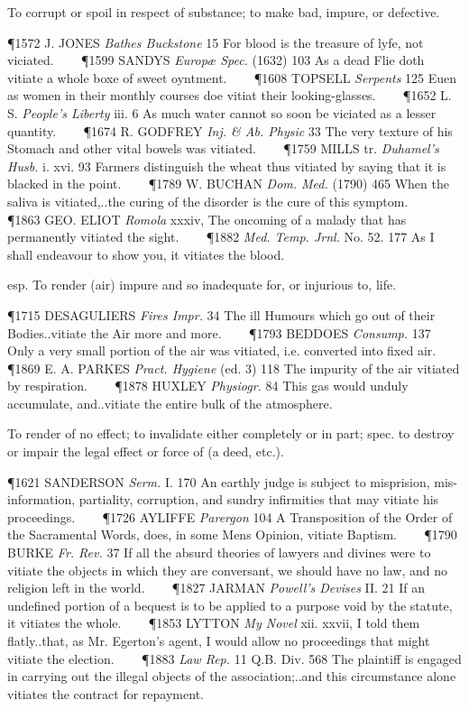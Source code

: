 \begin{description}[wide, labelwidth=!, labelindent=0pt]
\begin{myenumerate}
 To corrupt or spoil in respect of substance; to make bad, impure, or defective.

\P 1572 J. JONES  \textit{Bathes Buckstone} 15 For blood is the treasure of lyfe, not viciated.    
\P 1599 SANDYS  \textit{Europæ Spec.} (1632) 103 As a dead Flie doth vitiate a whole boxe of sweet oyntment.    
\P 1608 TOPSELL  \textit{Serpents} 125 Euen as women in their monthly courses doe vitiat their looking-glasses.    
\P 1652 L. S. \textit{People's  Liberty} iii. 6 As much water cannot so soon be viciated as a lesser quantity.    
\P 1674 R. GODFREY  \textit{Inj. \& Ab. Physic} 33 The very texture of his Stomach and other vital bowels was vitiated.    
\P 1759 MILLS tr.  \textit{Duhamel's Husb.} i. xvi. 93 Farmers distinguish the wheat thus vitiated by saying that it is blacked in the point.    
\P 1789 W. BUCHAN  \textit{Dom. Med.} (1790) 465 When the saliva is vitiated,..the curing of the disorder is the cure of this symptom.    
\P 1863 GEO. ELIOT  \textit{Romola} xxxiv, The oncoming of a malady that has permanently vitiated the sight.    
\P 1882  \textit{Med. Temp. Jrnl.} No. 52. 177 As I shall endeavour to show you, it vitiates the blood.

 esp. To render (air) impure and so inadequate for, or injurious to, life.

\P 1715 DESAGULIERS  \textit{Fires Impr.} 34 The ill Humours which go out of their Bodies..vitiate the Air more and more.    
\P 1793 BEDDOES  \textit{Consump.} 137 Only a very small portion of the air was vitiated, i.e. converted into fixed air.    
\P 1869 E. A. PARKES  \textit{Pract. Hygiene} (ed. 3) 118 The impurity of the air vitiated by respiration.    
\P 1878 HUXLEY  \textit{Physiogr.} 84 This gas would unduly accumulate, and..vitiate the entire bulk of the atmosphere.

 To render of no effect; to invalidate either completely or in part; spec. to destroy or impair the legal effect or force of (a deed, etc.).

\P 1621 SANDERSON  \textit{Serm.} I. 170 An earthly judge is subject to misprision, mis-information, partiality, corruption, and sundry infirmities that may vitiate his proceedings.    
\P 1726 AYLIFFE  \textit{Parergon} 104 A Transposition of the Order of the Sacramental Words, does, in some Mens Opinion, vitiate Baptism.    
\P 1790 BURKE  \textit{Fr. Rev.} 37 If all the absurd theories of lawyers and divines were to vitiate the objects in which they are conversant, we should have no law, and no religion left in the world.    
\P 1827 JARMAN  \textit{Powell's Devises} II. 21 If an undefined portion of a bequest is to be applied to a purpose void by the statute, it vitiates the whole.    
\P 1853 LYTTON  \textit{My Novel} xii. xxvii, I told them flatly..that, as Mr. Egerton's agent, I would allow no proceedings that might vitiate the election.    
\P 1883  \textit{Law Rep.} 11 Q.B. Div. 568 The plaintiff is engaged in carrying out the illegal objects of the association;..and this circumstance alone vitiates the contract for repayment.


\end{myenumerate}
\end{description}
